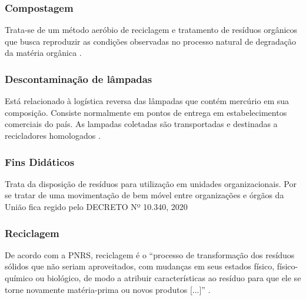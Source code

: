\subsubsection{Compostagem}

Trata-se de um método aeróbio de reciclagem e tratamento de resíduos orgânicos que busca reproduzir as condições observadas no processo natural de degradação da matéria orgânica \cite{diagnostico_cristine}.

\subsubsection{Descontaminação de lâmpadas}
Está relacionado à logística reversa das lâmpadas que contém mercúrio em sua composição. Consiste normalmente em pontos de entrega em estabelecimentos comerciais do país. As lampadas coletadas são transportadas e destinadas a recicladores homologados \cite{noauthor_legislacao_2023}.

\subsubsection{Fins Didáticos}

Trata da disposição de resíduos para utilização em unidades organizacionais. Por se tratar de uma movimentação de bem móvel entre organizações e órgãos da União fica regido pelo DECRETO Nº 10.340, 2020 \cite{brasil_decreto_2020}

\subsubsection{Reciclagem} 
De acordo com a \gls{PNRS}, reciclagem é o “processo de transformação dos resíduos sólidos que não seriam aproveitados, com mudanças em seus estados físico, físico-químico ou biológico, de modo a atribuir características ao resíduo para que ele se torne novamente matéria-prima ou novos produtos [...]” \cite[Art 3º, ítem XIV]{brasil_lei_nodate}.

